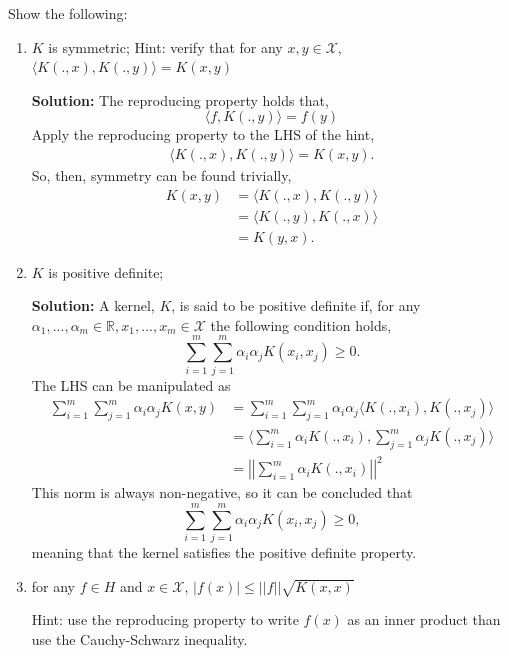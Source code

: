 \documentclass{article}[12pt]
\begin{document}
Show the following: 
\begin{enumerate}
\item $K$ is symmetric;
Hint: verify that for any $x,y \in \mathcal{X}$, $\langle K(.,x), K(.,y) \rangle = K(x,y)$

\textbf{Solution:} The reproducing property holds that, 
\begin{equation}
	\langle f, K(., y) \rangle = f(y)
\end{equation}
Apply the reproducing property to the LHS of the hint,
\begin{equation}
	\begin{aligned}
		\langle K(.,x), K(., y) \rangle = K(x, y).
	\end{aligned}
\end{equation}
So, then, symmetry can be found trivially,
\begin{equation}
	\begin{aligned}
		K(x, y) &= \langle K(., x), K(., y) \rangle \\
			&= \langle K(., y), K(., x) \rangle \\
			&= K(y, x).
	\end{aligned}
\end{equation}

\item $K$ is positive definite; 

\textbf{Solution:} A kernel, $K$, is said to be positive definite if, for any $\alpha_1, ..., \alpha_m \in \mathbb R, x_1, ..., x_m \in \mathcal X$ the following condition holds,
\begin{equation}
	\sum^{m}_{i=1} \sum^{m}_{j=1} \alpha_i \alpha_j K(x_i, x_j) \ge 0. 
\end{equation}
The LHS can be manipulated as 
\begin{equation}
	\begin{aligned}
		\sum^{m}_{i=1} \sum^{m}_{j=1} \alpha_i \alpha_j K(x, y)  &= \sum^{m}_{i=1} \sum^{m}_{j=1} \alpha_i \alpha_j \langle K(., x_i), K(., x_j) \rangle \\    
									 &=  \langle \sum^{m}_{i=1} \alpha_i K(., x_i), \sum^{m}_{j=1} \alpha_j K(., x_j)    \rangle \\
									 &= \left| \left| \sum^{m}_{i=1} \alpha_i K(., x_i)  \right| \right|^2
	\end{aligned}
\end{equation}
This norm is always non-negative, so it can be concluded that
\begin{equation}
	\sum^{m}_{i=1} \sum^{m}_{j=1} \alpha_i \alpha_j K(x_i, x_j) \ge 0, 
\end{equation}
meaning that the kernel satisfies the positive definite property.


\item for any $f \in H$ and $x \in \mathcal{X}$, $|f(x)|\leq ||f||\sqrt{K(x,x)}$

Hint: use the reproducing property to write $f(x)$ as an inner product than use the Cauchy-Schwarz inequality. 
\end{enumerate}
\end{document}

